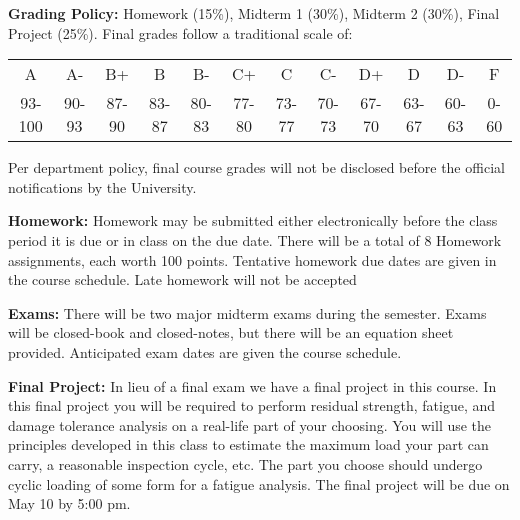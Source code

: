 \documentclass[11pt, a4paper]{article}
\begin{document}
\vspace*{.15in}
\noindent\textbf{Grading Policy:} 
Homework (15\%),  Midterm 1 (30\%), Midterm 2 (30\%), Final Project (25\%). 
Final grades follow a traditional scale of:
\begin{table}[H]
	\begin{tabular}{cccccccccccc}
		A & A- & B+ & B & B- & C+ & C & C- & D+ & D & D- & F \\ 
		93-100 & 90-93 & 87-90 & 83-87 & 80-83 & 77-80 & 73-77 & 70-73 & 67-70 & 63-67 & 60-63 & 0-60 \\ 
	\end{tabular}
\end{table}
Per department policy, final course grades will not be disclosed before the official notifications by the University.

\vspace*{.15in}
\noindent\textbf{Homework:} 
Homework may be submitted either electronically before the class period it is due or in class on the due date.
There will be a total of 8 Homework assignments, each worth 100 points.
Tentative homework due dates are given in the course schedule.
Late homework will not be accepted

\vspace*{.15in}
\noindent\textbf{Exams:} 
There will be two major midterm exams during the semester.
Exams will be closed-book and closed-notes, but there will be an equation sheet provided.
Anticipated exam dates are given the course schedule.

\vspace*{.15in}
\noindent\textbf{Final Project:} 
In lieu of a final exam we have a final project in this course.
In this final project you will be required to perform residual strength, fatigue, and damage tolerance analysis on a real-life part of your choosing.
You will use the principles developed in this class to estimate the maximum load your part can carry, a reasonable inspection cycle, etc.
The part you choose should undergo cyclic loading of some form for a fatigue analysis.
The final project will be due on May 10 by 5:00 pm.
\end{document}
